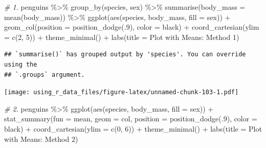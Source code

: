 \documentclass[
]{book}
\newenvironment{Shaded}{\begin{snugshade}}{\end{snugshade}}
\newcommand{\AttributeTok}[1]{\textcolor[rgb]{0.77,0.63,0.00}{#1}}
\newcommand{\CommentTok}[1]{\textcolor[rgb]{0.56,0.35,0.01}{\textit{#1}}}
\newcommand{\DecValTok}[1]{\textcolor[rgb]{0.00,0.00,0.81}{#1}}
\newcommand{\FunctionTok}[1]{\textcolor[rgb]{0.00,0.00,0.00}{#1}}
\newcommand{\NormalTok}[1]{#1}
\newcommand{\SpecialCharTok}[1]{\textcolor[rgb]{0.00,0.00,0.00}{#1}}
\newcommand{\StringTok}[1]{\textcolor[rgb]{0.31,0.60,0.02}{#1}}
\begin{document}
\begin{Shaded}
\begin{Highlighting}[]
\CommentTok{\# 1. }
\NormalTok{penguins }\SpecialCharTok{\%\textgreater{}\%} 
  \FunctionTok{group\_by}\NormalTok{(species, sex) }\SpecialCharTok{\%\textgreater{}\%} 
  \FunctionTok{summarise}\NormalTok{(}\AttributeTok{body\_mass =} \FunctionTok{mean}\NormalTok{(body\_mass)) }\SpecialCharTok{\%\textgreater{}\%} 
  \FunctionTok{ggplot}\NormalTok{(}\FunctionTok{aes}\NormalTok{(species, body\_mass, }\AttributeTok{fill =}\NormalTok{ sex)) }\SpecialCharTok{+}
  \FunctionTok{geom\_col}\NormalTok{(}\AttributeTok{position =} \FunctionTok{position\_dodge}\NormalTok{(.}\DecValTok{9}\NormalTok{), }\AttributeTok{color =} \StringTok{\textquotesingle{}black\textquotesingle{}}\NormalTok{) }\SpecialCharTok{+}
  \FunctionTok{coord\_cartesian}\NormalTok{(}\AttributeTok{ylim =} \FunctionTok{c}\NormalTok{(}\DecValTok{2}\NormalTok{, }\DecValTok{5}\NormalTok{)) }\SpecialCharTok{+} 
  \FunctionTok{theme\_minimal}\NormalTok{() }\SpecialCharTok{+} 
  \FunctionTok{labs}\NormalTok{(}\AttributeTok{title =} \StringTok{\textquotesingle{}Plot with Means: Method 1\textquotesingle{}}\NormalTok{)}
\end{Highlighting}
\end{Shaded}

\begin{verbatim}
## `summarise()` has grouped output by 'species'. You can override using the
## `.groups` argument.
\end{verbatim}

\texttt{[image: using\_r\_data\_files/figure-latex/unnamed-chunk-103-1.pdf]}

\begin{Shaded}
\begin{Highlighting}[]
\CommentTok{\# 2.}
\NormalTok{penguins }\SpecialCharTok{\%\textgreater{}\%} 
  \FunctionTok{ggplot}\NormalTok{(}\FunctionTok{aes}\NormalTok{(species, body\_mass, }\AttributeTok{fill =}\NormalTok{ sex)) }\SpecialCharTok{+}
  \FunctionTok{stat\_summary}\NormalTok{(}\AttributeTok{fun =}\NormalTok{ mean, }\AttributeTok{geom =} \StringTok{\textquotesingle{}col\textquotesingle{}}\NormalTok{, }\AttributeTok{position =} \FunctionTok{position\_dodge}\NormalTok{(.}\DecValTok{9}\NormalTok{), }
               \AttributeTok{color =} \StringTok{\textquotesingle{}black\textquotesingle{}}\NormalTok{) }\SpecialCharTok{+}
  \FunctionTok{coord\_cartesian}\NormalTok{(}\AttributeTok{ylim =} \FunctionTok{c}\NormalTok{(}\DecValTok{0}\NormalTok{, }\DecValTok{6}\NormalTok{)) }\SpecialCharTok{+}
  \FunctionTok{theme\_minimal}\NormalTok{() }\SpecialCharTok{+}
  \FunctionTok{labs}\NormalTok{(}\AttributeTok{title =} \StringTok{\textquotesingle{}Plot with Means: Method 2\textquotesingle{}}\NormalTok{)}
\end{Highlighting}
\end{Shaded}
\end{document}

